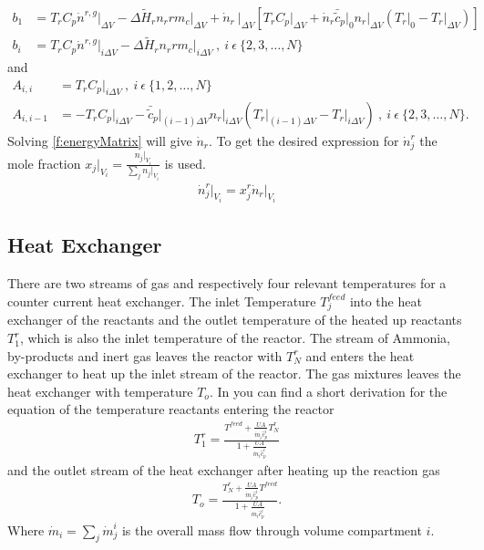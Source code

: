 \documentclass[paper=letter, fontsize=12pt]{article}
\begin{document}
\begin{align}
b_1&= T_r C_p \dot{n}^{r,g} \Big|_{\Delta V} - \Delta \tilde{H}_r n_r r m_c \Big|_{\Delta V} + \dot{n}_r\ \Big|_{\Delta V} \left[ T_r C_p \Big|_{\Delta V} + \dot{n}_r \bar{\tilde{c}}_p \Big|_{0} n_r\Big|_{\Delta V} \left( T_r\Big|_{0} - T_r\Big|_{\Delta V} \right) \right] \\
b_i&= T_r C_p \dot{n}^{r,g} \Big|_{i\Delta V} - \Delta \tilde{H}_r n_r r m_c \Big|_{i\Delta V}\ ,\ i\ \epsilon\  \{ 2,3,\dots ,N\}
\end{align}
and
\begin{align}
A_{i,i}&=T_r C_p\Big|_{i\Delta V}\ , \ i\ \epsilon\  \{ 1,2,\dots ,N\}\\
A_{i,i-1}&=-T_r C_p \Big|_{i\Delta V} - \bar{\tilde{c}}_p\Big|_{(i-1)\Delta V} n_r\Big|_{i\Delta V} \left(T_r\Big|_{(i-1)\Delta V} - T_r \Big|_{i\Delta V} \right)\ , \ i\ \epsilon\  \{ 2,3,\dots ,N\}.
\end{align}
Solving \autoref{f:energyMatrix} will give $\dot{n}_r$. To get the desired expression for $\dot{n}^r_j$ the mole fraction $x_j \Big|_{V_i}=\frac{n_j \Big|_{V_i}}{\sum_j n_j \Big|_{V_i}}$ is used.
\begin{align}
\dot{n}^r_j \Big|_{V_i} =x^r_j \dot{n}_r \Big|_{V_i} \label{f:molarOutlet}
\end{align}

\subsection{Heat Exchanger}
There are two streams of gas and respectively four relevant temperatures for a counter current heat exchanger. The inlet Temperature $T^{feed}_j$ into the heat exchanger of the reactants and the outlet temperature of the heated up reactants $T^r_1$, which is also the inlet temperature of the reactor. The stream of Ammonia, by-products and inert gas leaves the reactor with $T^r_N$ and enters the heat exchanger to heat up the inlet stream of the reactor. The gas mixtures leaves the heat exchanger with temperature $T_o$. In \cite{Jinasena2016} you can find a short derivation for the equation of the temperature reactants entering the reactor
\begin{align}
T^r_1=\frac{T^{feed} + \frac{U A}{\dot{m}_i \hat{c}^i_p} T^r_N}{1 + \frac{U A}{\dot{m}_i \hat{c}^i_p}} \label{f:tempInReact}
\end{align}
and the outlet stream of the heat exchanger after heating up the reaction gas
\begin{align}
T_o=\frac{T^r_N + \frac{U A}{\dot{m}_i \hat{c}^i_p} T^{feed}}{1+ \frac{U A}{\dot{m}_i \hat{c}^i_p}}. \label{f:tempOutExchanger}
\end{align}
Where $\dot{m}_i=\sum_j \dot{m}^i_j$ is the overall mass flow through volume compartment $i$.
\end{document}
